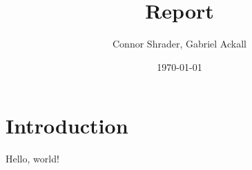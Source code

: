 \documentclass{article}
\title{Report}
\author{Connor Shrader, Gabriel Ackall}
\date{\today}
\begin{document}
\maketitle

\section{Introduction}
Hello, world!
\end{document}
